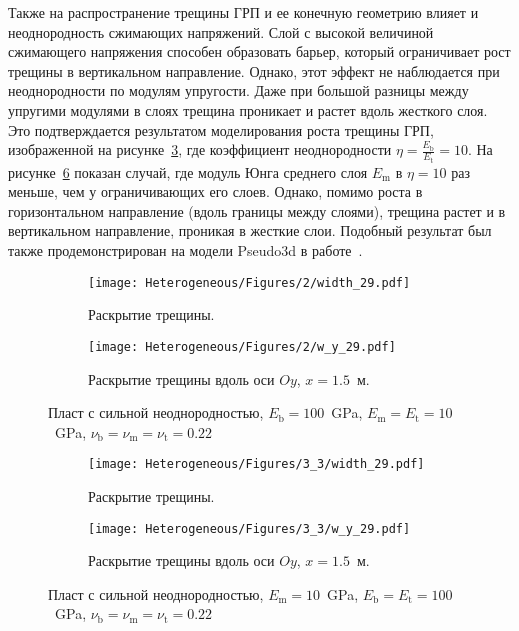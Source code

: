 Также на распространение трещины ГРП и ее конечную геометрию влияет и неоднородность сжимающих напряжений. Слой с высокой величиной сжимающего напряжения способен образовать барьер, который ограничивает рост трещины в вертикальном направление. Однако, этот эффект не наблюдается при неоднородности по модулям упругости. Даже при большой разницы между упругими модулями в слоях трещина проникает и растет вдоль жесткого слоя. Это подтверждается результатом моделирования роста трещины ГРП, изображенной на рисунке~\ref{fig:heterogeneous-high}, где коэффициент неоднородности $\eta=\frac{E_\text{b}}{E_\text{t}} = 10$. На рисунке~\ref{fig:heterogeneous-3layer} показан случай, где модуль Юнга среднего слоя $E_\text{m}$ в $\eta=10$ раз меньше, чем у ограничивающих его слоев. Однако, помимо роста в горизонтальном направление (вдоль границы между слоями), трещина растет и в вертикальном направление, проникая в жесткие слои. Подобный результат был также продемонстрирован на модели Pseudo3d в работе~\cite{gu2006}.
\begin{figure}[htbp]
    \centering
    \begin{subfigure}[t]{0.4\textwidth}
        \centering
        \texttt{[image: Heterogeneous/Figures/2/width\_29.pdf]}
        \caption{Раскрытие трещины.}
        \label{fig:heterogeneous-high-planar}
    \end{subfigure}
    \hfill 
    \begin{subfigure}[t]{0.55\textwidth}
        \centering
        \texttt{[image: Heterogeneous/Figures/2/w\_y\_29.pdf]}
        \caption{Раскрытие трещины вдоль оси $Oy$, $x=1.5$~м.}
        \label{fig:heterogeneous-high-slice}
    \end{subfigure}
    \caption{Пласт с сильной неоднородностью, $E_\text{b} = 100$~GPa, $E_\text{m} = E_\text{t} = 10$~GPa, $\nu_\text{b} = \nu_\text{m} = \nu_\text{t} = 0.22$}
    \label{fig:heterogeneous-high}
\end{figure}


\begin{figure}[htbp]
    \centering
    \begin{subfigure}[t]{0.4\textwidth}
        \centering
        \texttt{[image: Heterogeneous/Figures/3\_3/width\_29.pdf]}
        \caption{Раскрытие трещины.}
        \label{fig:heterogeneous-3layer-planar}
    \end{subfigure}
    \hfill 
    \begin{subfigure}[t]{0.55\textwidth}
        \centering
        \texttt{[image: Heterogeneous/Figures/3\_3/w\_y\_29.pdf]}
        \caption{Раскрытие трещины вдоль оси $Oy$, $x=1.5$~м.}
        \label{fig:heterogeneous-3layer-slice}
    \end{subfigure}
    \caption{Пласт с сильной неоднородностью, $E_\text{m} = 10$~GPa, $E_\text{b} = E_\text{t} = 100$~GPa, $\nu_\text{b} = \nu_\text{m} = \nu_\text{t} = 0.22$}
    \label{fig:heterogeneous-3layer}
\end{figure}


